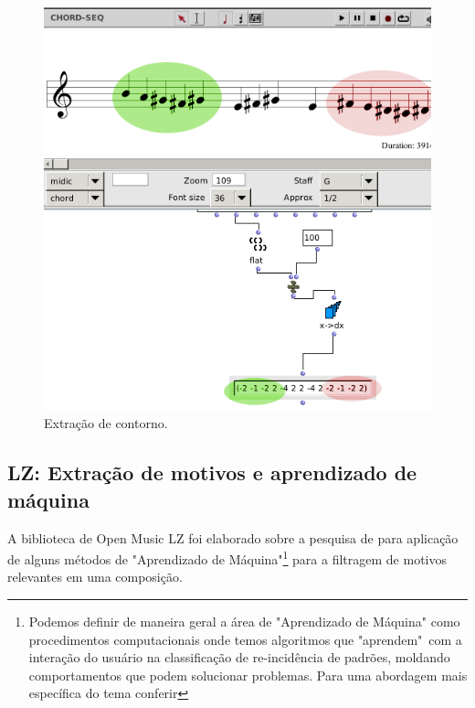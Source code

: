 \documentclass[
	12pt,				%
	openright,			%
	twoside,			%
	a4paper,			%
	english,			%
	french,				%
	spanish,			%
	brazil				%
	]{abntex2}
\begin{document}
\lipsum[9]

\begin{figure}[!h]
	\caption{\label{fig_grafico}Extração de contorno. }
	\begin{center}
	    \includegraphics[scale=0.55]{OM_settheory/x_dx.png}
	\end{center}
\end{figure}



\lipsum[11]	


\pagebreak
\subsection{LZ: Extração de motivos e aprendizado de máquina}	

A biblioteca de Open Music LZ foi elaborado sobre a pesquisa de  para aplicação de alguns métodos de "Aprendizado de Máquina"\footnote{Podemos definir de maneira geral a área de "Aprendizado de Máquina" como procedimentos computacionais onde temos algoritmos que "aprendem"\ com a interação do usuário na classificação de re-incidência de padrões, moldando comportamentos que podem solucionar problemas. Para uma abordagem mais específica do tema conferir } para a filtragem de motivos relevantes em uma composição.
\end{document}
